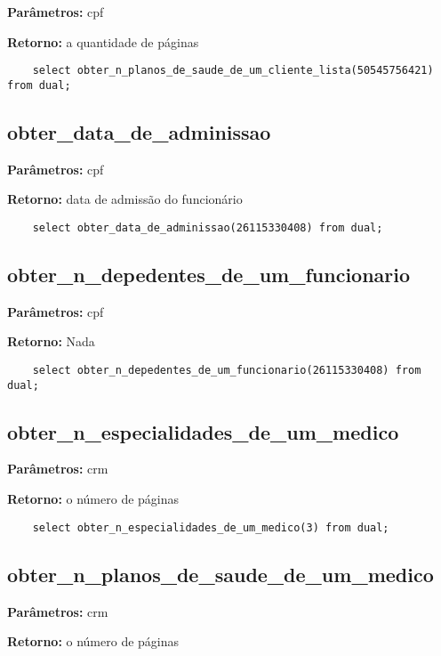 \textbf{Parâmetros:} cpf

\textbf{Retorno:} a quantidade de páginas

\begin{verbatim}
	select obter_n_planos_de_saude_de_um_cliente_lista(50545756421) from dual;
\end{verbatim}

\subsection{obter\_data\_de\_adminissao}

\textbf{Parâmetros:} cpf

\textbf{Retorno:} data de admissão do funcionário

\begin{verbatim}
	select obter_data_de_adminissao(26115330408) from dual;
\end{verbatim}

\subsection{obter\_n\_depedentes\_de\_um\_funcionario}

\textbf{Parâmetros:} cpf

\textbf{Retorno:} Nada

\begin{verbatim}
	select obter_n_depedentes_de_um_funcionario(26115330408) from dual;
\end{verbatim}

\subsection{obter\_n\_especialidades\_de\_um\_medico}

\textbf{Parâmetros:} crm

\textbf{Retorno:} o número de páginas

\begin{verbatim}
	select obter_n_especialidades_de_um_medico(3) from dual;
\end{verbatim}

\subsection{obter\_n\_planos\_de\_saude\_de\_um\_medico}

\textbf{Parâmetros:} crm

\textbf{Retorno:} o número de páginas

